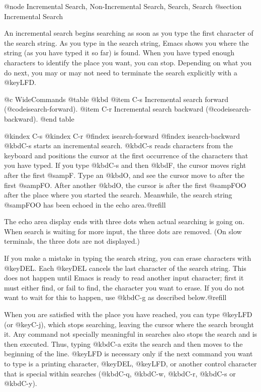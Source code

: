 {{{{@node Incremental Search, Non-Incremental Search, Search, Search
@section Incremental Search

  An incremental search begins searching as soon as you type the first
character of the search string.  As you type in the search string, Emacs
shows you where the string (as you have typed it so far) is found.
When you have typed enough characters to identify the place you want, you
can stop.  Depending on what you do next, you may or may not need to
terminate the search explicitly with a @key{LFD}.

@c WideCommands
@table @kbd
@item C-s
Incremental search forward (@code{isearch-forward}).
@item C-r
Incremental search backward (@code{isearch-backward}).
@end table

@kindex C-s
@kindex C-r
@findex isearch-forward
@findex isearch-backward
  @kbd{C-s} starts an incremental search.  @kbd{C-s} reads characters from
the keyboard and positions the cursor at the first occurrence of the
characters that you have typed.  If you type @kbd{C-s} and then @kbd{F},
the cursor moves right after the first @samp{F}.  Type an @kbd{O}, and see
the cursor move to after the first @samp{FO}.  After another @kbd{O}, the
cursor is after the first @samp{FOO} after the place where you started the
search.  Meanwhile, the search string @samp{FOO} has been echoed in the
echo area.@refill

  The echo area display ends with three dots when actual searching is going
on.  When search is waiting for more input, the three dots are removed.
(On slow terminals, the three dots are not displayed.)

  If you make a mistake in typing the search string, you can erase
characters with @key{DEL}.  Each @key{DEL} cancels the last character of the
search string.  This does not happen until Emacs is ready to read another
input character; first it must either find, or fail to find, the character
you want to erase.  If you do not want to wait for this to happen, use
@kbd{C-g} as described below.@refill

  When you are satisfied with the place you have reached, you can type
@key{LFD} (or @key{C-j}), which stops searching, leaving the cursor where 
the search brought it.  Any command not specially meaningful in searches also
stops the search and is then executed.  Thus, typing @kbd{C-a} exits the
search and then moves to the beginning of the line.  @key{LFD} is necessary
only if the next command you want to type is a printing character,
@key{DEL}, @key{LFD}, or another control character that is special within
searches (@kbd{C-q}, @kbd{C-w}, @kbd{C-r}, @kbd{C-s} or @kbd{C-y}).

}}}}
